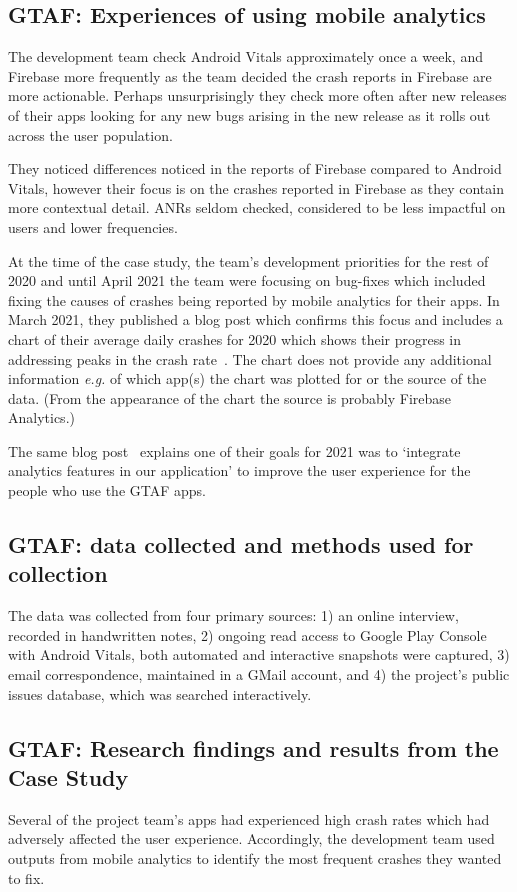 \subsection{GTAF: Experiences of using mobile analytics}
The development team check Android Vitals approximately once a week, and Firebase more frequently as the team decided the crash reports in Firebase are more actionable. Perhaps unsurprisingly they check more often after new releases of their apps looking for any new bugs arising in the new release as it rolls out across the user population.

They noticed differences noticed in the reports of Firebase compared to Android Vitals, however their focus is on the crashes reported in Firebase as they contain more contextual detail. ANRs seldom checked, considered to be less impactful on users and lower frequencies. %

At the time of the case study, the team's development priorities for the rest of 2020 and until April 2021 the team were focusing on bug-fixes which included fixing the causes of crashes being reported by mobile analytics for their apps. In March 2021, they published a blog post which confirms this focus and includes a chart of their average daily crashes for 2020 which shows their progress in addressing peaks in the crash rate~\citep{gtafblog2021_gtaf_accomplishment_2020}. The chart does not provide any additional information \emph{e.g.} of which app(s) the chart was plotted for or the source of the data. (From the appearance of the chart the source is probably Firebase Analytics.)

The same blog post~\citep{gtafblog2021_gtaf_accomplishment_2020} explains one of their goals for 2021 was to `integrate analytics features in our application' to improve the user experience for the people who use the GTAF apps.

\subsection{GTAF: data collected and methods used for collection}
The data was collected from four primary sources: 1) an online interview, recorded in handwritten notes, 2) ongoing read access to Google Play Console with Android Vitals, both automated and interactive snapshots were captured, 3) email correspondence, maintained in a GMail account, and 4) the project's public issues database, which was searched interactively. 

\subsection{GTAF: Research findings and results from the Case Study}
Several of the project team's apps had experienced high crash rates which had adversely affected the user experience. Accordingly, the development team used outputs from mobile analytics to identify the most frequent crashes they wanted to fix.

